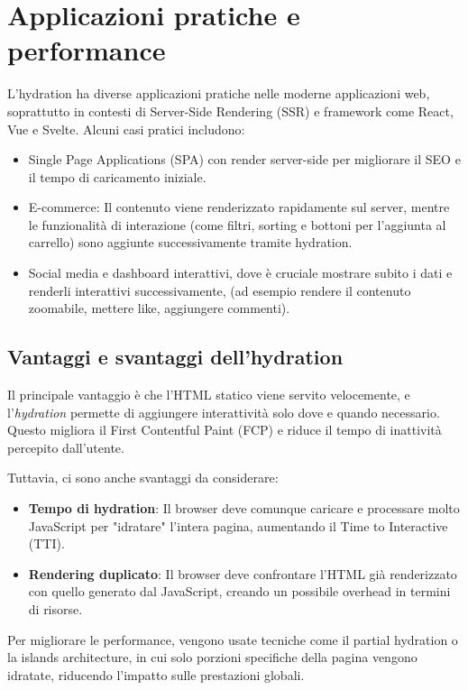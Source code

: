 \section{Applicazioni pratiche e performance}

L'hydration ha diverse applicazioni pratiche nelle moderne applicazioni web, soprattutto in contesti di Server-Side Rendering (SSR) e framework come React, Vue e Svelte. Alcuni casi pratici includono:
\begin{itemize}
    \item Single Page Applications (SPA) con render server-side per migliorare il SEO e il tempo di caricamento iniziale.
    \item E-commerce: Il contenuto viene renderizzato rapidamente sul server, mentre le funzionalità di interazione (come filtri, sorting e bottoni per l'aggiunta al carrello) sono aggiunte successivamente tramite hydration.
    \item Social media e dashboard interattivi, dove è cruciale mostrare subito i dati e renderli interattivi successivamente, (ad esempio rendere il contenuto zoomabile, mettere like, aggiungere commenti).
\end{itemize}

\subsection{Vantaggi e svantaggi dell'hydration}
Il principale vantaggio è che l'HTML statico viene servito velocemente, e l'\emph{hydration} permette di aggiungere interattività solo dove e quando necessario. Questo migliora il First Contentful Paint (FCP) e riduce il tempo di inattività percepito dall'utente.

Tuttavia, ci sono anche svantaggi da considerare:
\begin{itemize}
    \item \textbf{Tempo di hydration}: Il browser deve comunque caricare e processare molto JavaScript per "idratare" l'intera pagina, aumentando il Time to Interactive (TTI).
    \item \textbf{Rendering duplicato}: Il browser deve confrontare l'HTML già renderizzato con quello generato dal JavaScript, creando un possibile overhead in termini di risorse.
\end{itemize}

Per migliorare le performance, vengono usate tecniche come il partial hydration o la islands architecture, in cui solo porzioni specifiche della pagina vengono idratate, riducendo l'impatto sulle prestazioni globali.